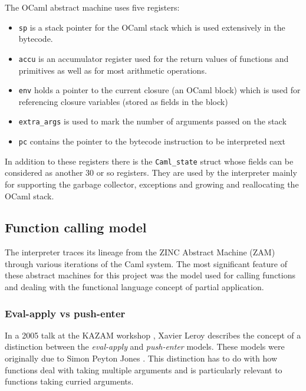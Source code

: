 The OCaml abstract machine uses five registers:

\begin{itemize}
    \item \texttt{sp} is a stack pointer for the OCaml stack which is used extensively
          in the bytecode.
    \item \texttt{accu} is an accumulator register used for the return values of functions
          and primitives as well as for most arithmetic operations.
    \item \texttt{env} holds a pointer to the current closure (an OCaml block) which is used for
          referencing closure variables (stored as fields in the block)
    \item \texttt{extra\_args} is used to mark the number of arguments passed on the stack
    \item \texttt{pc} contains the pointer to the bytecode instruction to be interpreted next
\end{itemize}

In addition to these registers there is the \texttt{Caml\_state} struct whose fields can be
considered as another 30 or so registers. They are used by the interpreter mainly for supporting
the garbage collector, exceptions and growing and reallocating the OCaml stack.

\subsection{Function calling model}

The interpreter traces its lineage from the ZINC Abstract Machine (ZAM) \cite{zinc} through various
iterations of the Caml system. The most significant feature of these abstract machines for this
project was the model used for calling functions and dealing with the functional language concept
of partial application.

\subsubsection{Eval-apply vs push-enter}

In a 2005 talk at the KAZAM workshop \cite{xavtalk}, Xavier Leroy describes the concept of a
distinction between the \emph{eval-apply} and \emph{push-enter} models. These models were
originally due to Simon Peyton Jones \cite{jones}\cite{marlow-jones}. This distinction has to do
with how functions deal with taking
multiple arguments and is particularly relevant to functions taking curried arguments.

